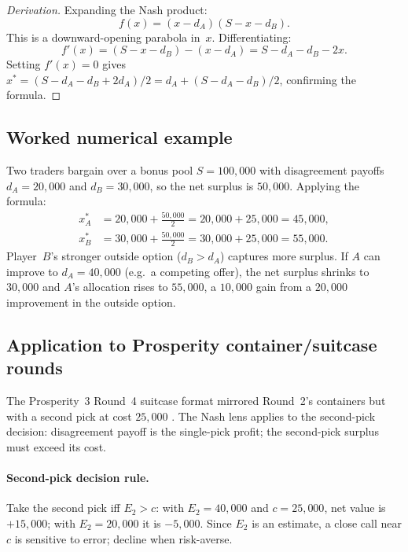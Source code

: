 \begin{proof}[Derivation]
Expanding the Nash product:
\[
  f(x) = (x - d_A)(S - x - d_B).
\]
This is a downward-opening parabola in~$x$.  Differentiating:
\[
  f'(x) = (S - x - d_B) - (x - d_A)
  = S - d_A - d_B - 2x.
\]
Setting $f'(x) = 0$ gives $x^* = (S - d_A - d_B + 2d_A)/2
= d_A + (S - d_A - d_B)/2$, confirming the formula.
\end{proof}

\subsection{Worked numerical example}

Two traders bargain over a bonus pool $S = 100{,}000$ with
disagreement payoffs $d_A = 20{,}000$ and $d_B = 30{,}000$, so
the net surplus is $50{,}000$.  Applying the formula:
\begin{align*}
  x^*_A &= 20{,}000 + \frac{50{,}000}{2}
  = 20{,}000 + 25{,}000 = 45{,}000, \\[4pt]
  x^*_B &= 30{,}000 + \frac{50{,}000}{2}
  = 30{,}000 + 25{,}000 = 55{,}000.
\end{align*}
Player~$B$'s stronger outside option ($d_B > d_A$) captures more
surplus.  If $A$ can improve to $d_A = 40{,}000$ (e.g.\ a competing
offer), the net surplus shrinks to $30{,}000$ and $A$'s allocation
rises to $55{,}000$, a $10{,}000$ gain from a $20{,}000$ improvement
in the outside option.

\subsection{Application to Prosperity container/suitcase rounds}

The Prosperity~3 Round~4 suitcase format mirrored Round~2's
containers but with a second pick at cost $25{,}000$
\citep{frankfurtHedgehogs2025imcP3}.  The Nash lens applies to
the second-pick decision: disagreement payoff is the single-pick
profit; the second-pick surplus must exceed its cost.

\paragraph{Second-pick decision rule.}
Take the second pick iff $E_2 > c$: with $E_2 = 40{,}000$ and
$c = 25{,}000$, net value is $+15{,}000$; with $E_2 = 20{,}000$
it is $-5{,}000$.  Since $E_2$ is an estimate, a close call near
$c$ is sensitive to error; decline when risk-averse.

